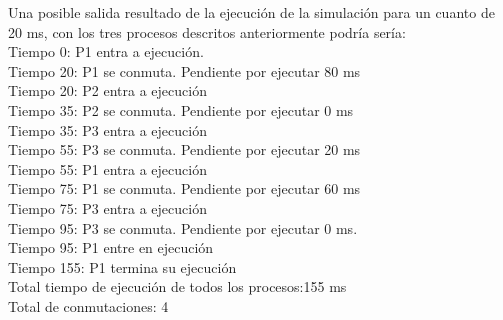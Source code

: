 \begin{enumerate}
	Una posible salida resultado de la ejecución de la simulación para un cuanto de 20 ms, con los tres procesos descritos anteriormente podría sería:\\
	Tiempo 0: P1 entra a ejecución. \\
	Tiempo 20: P1 se conmuta.  Pendiente por ejecutar 80 ms\\
	Tiempo 20: P2 entra a ejecución\\
	Tiempo 35: P2 se conmuta. Pendiente por ejecutar 0 ms\\
	Tiempo 35: P3 entra a ejecución\\
	Tiempo 55: P3 se conmuta. Pendiente por ejecutar 20 ms\\
	Tiempo 55: P1 entra a ejecución\\
	Tiempo 75: P1 se conmuta. Pendiente por ejecutar 60 ms\\
	Tiempo 75: P3 entra a ejecución\\
	Tiempo 95: P3 se conmuta. Pendiente por ejecutar 0 ms.\\
	Tiempo 95: P1 entre en ejecución\\
	Tiempo 155: P1 termina su ejecución\\
	Total tiempo de ejecución de todos los procesos:155 ms\\
	Total de conmutaciones: 4\\
\end{enumerate}

